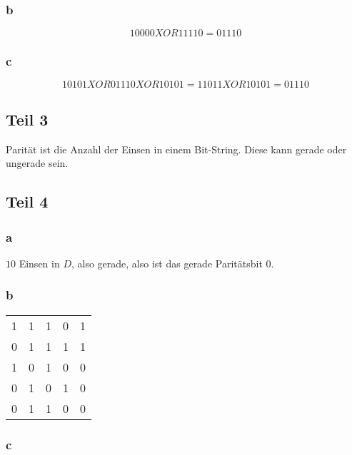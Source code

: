 \documentclass[10pt,a4paper]{article}
\begin{document}
\subsubsection{b}

\begin{equation}
  10000 XOR 11110 = 01110
\end{equation}

\subsubsection{c}

\begin{equation}
  10101 XOR 01110 XOR 10101 = 11011 XOR 10101 = 01110
\end{equation}

\subsection{Teil 3}

Parität ist die Anzahl der Einsen in einem Bit-String. Diese kann gerade oder
ungerade sein.

\subsection{Teil 4}

\subsubsection{a}

$10$ Einsen in $D$, also gerade, also ist das gerade Paritätsbit $0$.

\subsubsection{b}

\begin{tabular}{cccc|c}
  1 & 1 & 1 & 0 & 1\\
  0 & 1 & 1 & 1 & 1\\
  1 & 0 & 1 & 0 & 0\\
  0 & 1 & 0 & 1 & 0\\\hline
  0 & 1 & 1 & 0 & 0
\end{tabular}

\subsubsection{c}
\end{document}
